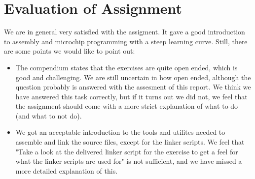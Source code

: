 \section{Evaluation of Assignment}
We are in general very satisfied with the assigment. It gave a good introduction to assembly and microchip programming with a steep learning curve. Still, there are some points we would like to point out:
\begin{itemize}
	\item The compendium states that the exercises are quite open ended, which is good and challenging. We are still uncertain in how open ended, although the question probably is answered with the assesment of this report. We think we have answered this task correctly, but if it turns out we did not, we feel that the assignment should come with a more strict explanation of what to do (and what to not do).
	\item We got an acceptable introduction to the tools and utilites needed to assemble and link the source files, except for the linker scripts. We feel that "Take a look at the delivered linker script for the exercise to get a feel for what the linker scripts are used for" is not sufficient, and we have missed a more detailed explanation of this.
\end{itemize}

